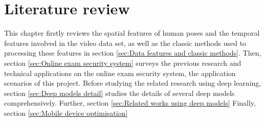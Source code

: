 \chapter{Literature review}
\label{chap:Literature review}
This chapter firstly reviews the spatial features of human poses and the temporal features involved in the video data set, as well as the classic methods used to processing these features in section \ref{sec:Data features and classic methods}.
Then, section \ref{sec:Online exam security system} surveys the previous research and technical applications on the online exam security system, the application scenarios of this project.
Before studying the related research using deep learning, section \ref{sec:Deep models detail} studies the details of several deep models comprehensively.
Further, section \ref{sec:Related works using deep models}
Finally, section \ref{sec:Mobile device optimisation}
